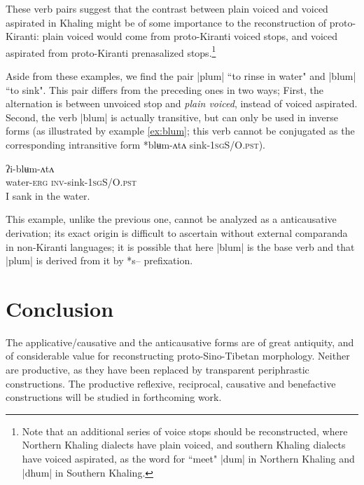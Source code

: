 \documentclass[oldfontcommands,oneside,a4paper,11pt]{article}
\newcommand{\ipa}[1]{{\phon #1}} %
\begin{document}
These verb pairs suggest that the contrast between plain voiced and voiced aspirated in Khaling might be of some importance to the reconstruction of proto-Kiranti: plain voiced would come from proto-Kiranti voiced stops, and voiced aspirated from proto-Kiranti prenasalized stops.\footnote{Note that an additional series of voice stops should be reconstructed, where Northern Khaling dialects have plain voiced, and southern Khaling dialects have voiced aspirated, as the word for ``meet" |dum| in Northern Khaling and |dhum| in Southern Khaling.}


Aside from these examples, we find the pair |plum| ``to rinse in water" and |blum| ``to sink". This pair differs from the preceding ones in two ways; First, the alternation is between unvoiced stop and\textit{ plain voiced}, instead of voiced aspirated. Second, the verb |blum| is actually transitive, but can only be used in inverse forms (as illustrated by example \ref{ex:blum}; this verb cannot be conjugated as the corresponding intransitive form *blʉm-ʌtʌ sink-\textsc{1sgS/O.pst}).

\begin{exe}
\ex \label{ex:blum}
\gll \ipa{ku-ʔɛ} \ipa{ʔi-blʉm-ʌtʌ}\\
water-\textsc{erg} \textsc{inv}-sink-\textsc{1sgS/O.pst} \\
\glt I sank in the water.
\end{exe}

 
This example, unlike the previous one, cannot be analyzed as a anticausative derivation; its exact origin is difficult to ascertain without external comparanda in non-Kiranti languages; it is possible that here |blum| is the base verb and that |plum| is derived from it by *s-- prefixation.
 


\section{Conclusion}
The applicative/causative and the anticausative forms are of great antiquity, and of considerable value for reconstructing  proto-Sino-Tibetan morphology. Neither are productive, as they have been replaced by transparent periphrastic constructions. The productive reflexive, reciprocal, causative and benefactive constructions will be studied in forthcoming work.






\end{document}
